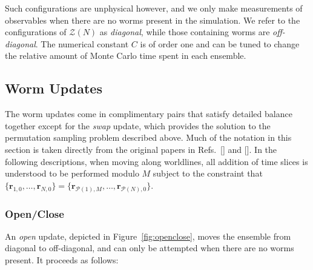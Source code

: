 \documentclass[prb,10pt,aps,floatfix,notitlepage]{revtex4-1}
\renewcommand{\vec}[1]{\boldsymbol{#1}}
\begin{document}
%
Such configurations are unphysical however, and we only make measurements of
observables when there are no worms present in the simulation. We refer to the
configurations of $\mathcal{Z}(N)$ as \emph{diagonal}, while those containing
worms are \emph{off-diagonal}. The numerical constant $C$ is of order one and
can be tuned to change the relative amount of Monte Carlo time spent in each
ensemble. 


\subsection{Worm Updates}
The worm updates come in complimentary pairs that satisfy detailed balance
together except for the \emph{swap} update, which provides the solution to the
permutation sampling problem described above. Much of the notation in this
section is taken directly from the original papers in
Refs.~[] and [].
In the following descriptions, when moving along worldlines, all addition of
time slices is understood to be performed modulo $M$ subject to the constraint
that $\{\vec{r}_{1,0},\ldots,\vec{r}_{N,0}\} = 
\{\vec{r}_{{\mathcal{P}}(1),M},\ldots,\vec{r}_{{\mathcal{P}}(N),0}\}$.

\subsubsection{Open/Close}
An \emph{open} update, depicted in Figure~\ref{fig:openclose}, moves the
ensemble from diagonal to off-diagonal, and can only be attempted when there
are no worms present.  
It proceeds as follows:
\end{document}
